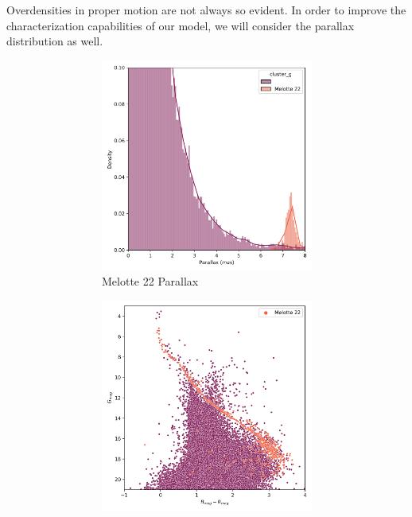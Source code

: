 \documentclass[11pt, a4paper, english]{book}
\begin{document}
Overdensities in proper motion are not always so evident.
In order to improve the characterization capabilities of our model,
we will consider the parallax distribution as well.

\begin{figure}[htbp]
  \centering
  \begin{subfigure}{0.9\textwidth}
    \centering
    \begin{subfigure}[t]{0.45\textwidth}
      \centering
      \includegraphics[width=\textwidth]{../figures/melotte_22/parallax_zoom_melotte_22.png}
      \caption{Melotte 22 Parallax}
      \label{fig:melotte_22_parallax_zoom}
    \end{subfigure}
    \hfill
    \begin{subfigure}[t]{0.45\textwidth}
      \centering
      \includegraphics[width=\textwidth]{../figures/melotte_22/hr_diagram_melotte_22.png}

\end{subfigure}
\end{subfigure}
\end{figure}
\end{document}
